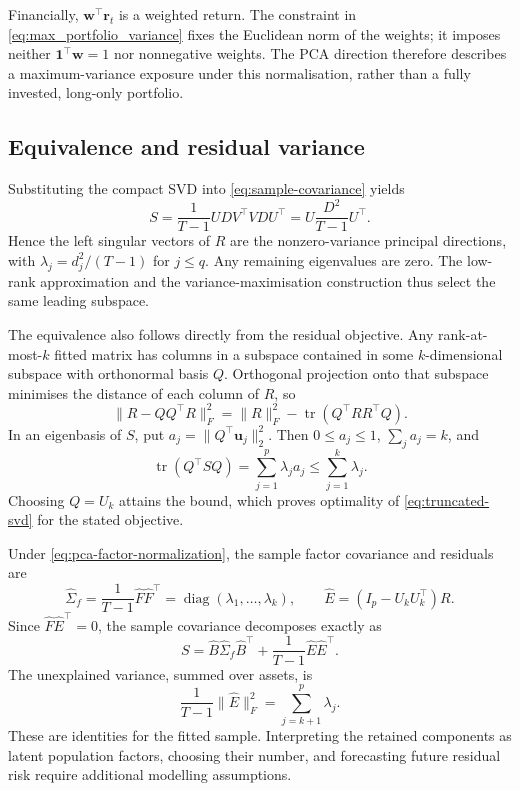 Financially, $\mathbf{w}^\top\mathbf{r}_t$ is a weighted return. The constraint
in \eqref{eq:max_portfolio_variance} fixes the Euclidean norm of the weights;
it imposes neither $\mathbf{1}^\top\mathbf{w}=1$ nor nonnegative weights.
The PCA direction therefore describes a maximum-variance exposure under this
normalisation, rather than a fully invested, long-only portfolio.

\subsection{Equivalence and residual variance}

Substituting the compact SVD into \eqref{eq:sample-covariance} yields
\begin{equation}
  \label{eq:svd-covariance}
  S=\frac{1}{T-1}UDV^\top VD U^\top
   =U\frac{D^2}{T-1}U^\top.
\end{equation}
Hence the left singular vectors of $R$ are the nonzero-variance principal
directions, with $\lambda_j=d_j^2/(T-1)$ for $j\leq q$.
Any remaining eigenvalues are zero. The low-rank approximation and the
variance-maximisation construction thus select the same leading subspace.

The equivalence also follows directly from the residual objective. Any
rank-at-most-$k$ fitted matrix has columns in a subspace contained in some
$k$-dimensional subspace with orthonormal basis $Q$. Orthogonal projection
onto that subspace minimises the distance of each column of $R$, so
\[
  \lVert R-QQ^\top R\rVert_F^2
  =\lVert R\rVert_F^2-\operatorname{tr}(Q^\top RR^\top Q).
\]
In an eigenbasis of $S$, put $a_j=\lVert Q^\top\mathbf{u}_j\rVert_2^2$.
Then $0\leq a_j\leq1$, $\sum_j a_j=k$, and
\[
  \operatorname{tr}(Q^\top S Q)=\sum_{j=1}^p\lambda_j a_j
  \leq\sum_{j=1}^k\lambda_j.
\]
Choosing $Q=U_k$ attains the bound, which proves optimality of
\eqref{eq:truncated-svd} for the stated objective.

Under \eqref{eq:pca-factor-normalization}, the sample factor covariance and
residuals are
\[
  \widehat\Sigma_f
  =\frac{1}{T-1}\widehat F\widehat F^\top
  =\operatorname{diag}(\lambda_1,\ldots,\lambda_k),
  \qquad
  \widehat E=(I_p-U_kU_k^\top)R.
\]
Since $\widehat F\widehat E^\top=0$, the sample covariance decomposes exactly as
\begin{equation}
  \label{eq:pca-sample-decomposition}
  S=\widehat B\widehat\Sigma_f\widehat B^\top
    +\frac{1}{T-1}\widehat E\widehat E^\top.
\end{equation}
The unexplained variance, summed over assets, is
\[
  \frac{1}{T-1}\lVert\widehat E\rVert_F^2
  =\sum_{j=k+1}^p\lambda_j.
\]
These are identities for the fitted sample. Interpreting the retained
components as latent population factors, choosing their number, and forecasting
future residual risk require additional modelling assumptions.

